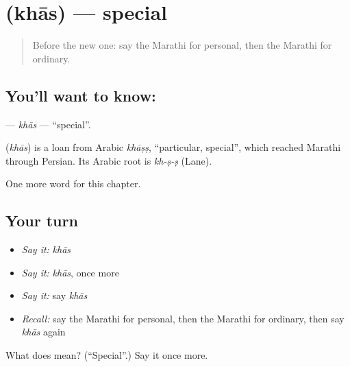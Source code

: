 \section[\texorpdfstring{\mr{खास} (khās)}{खास (khās)}]{ (khās) — special}

\label{lesson:MR-C206-khas}



\begin{quote}
Before the new one: say the Marathi for personal, then the Marathi for ordinary.
\end{quote}

\subsection*{You'll want to know: }
\textbf{} — \emph{khās} — \textquotedblleft{}special\textquotedblright{}.

\begin{cousinweb}
\textbf{} (\emph{khās}) is a loan from Arabic \emph{khāṣṣ}, \textquotedblleft{}particular, special\textquotedblright{}, which reached Marathi through Persian. Its Arabic root is \emph{kh-ṣ-ṣ} (Lane).
\end{cousinweb}

\begin{grammarlens}[title={What you've built}]
One more word for this chapter.
\end{grammarlens}

\subsection*{Your turn}
\begin{itemize}
\raggedright
  \item \emph{Say it:} \emph{khās}
  \item \emph{Say it:} \emph{khās}, once more
  \item \emph{Say it:} say \emph{khās}
  \item \emph{Recall:} say the Marathi for personal, then the Marathi for ordinary, then say \emph{khās} again
\end{itemize}

\begin{tcolorbox}[breakable,colback=teal!4,colframe=teal!35!black,title={Before you move on}]
What does  mean? (\textquotedblleft{}Special\textquotedblright{}.) Say it once more.
\end{tcolorbox}

